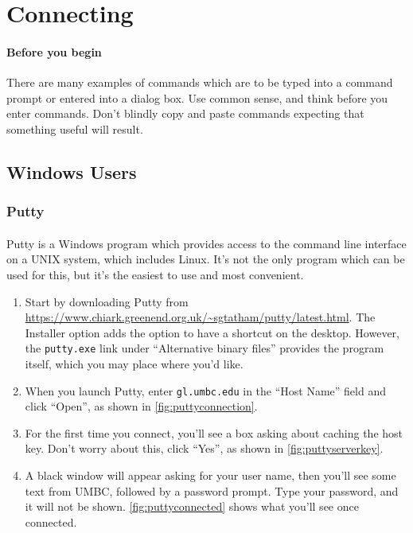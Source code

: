 \documentclass[letter,11pt]{article}
\begin{document}
\tableofcontents

\section{Connecting}
\paragraph{Before you begin} There are many examples of commands which are to be typed into a command prompt or entered into a dialog box. Use common sense, and think before you enter commands. Don't blindly copy and paste commands expecting that something useful will result.

\subsection{Windows Users}
\FloatBarrier
\subsubsection{Putty}
\paragraph{}Putty is a Windows program which provides access to the command line interface on a UNIX system, which includes Linux. It's not the only program which can be used for this, but it's the easiest to use and most convenient.

\begin{enumerate}
    \item Start by downloading Putty from \url{https://www.chiark.greenend.org.uk/~sgtatham/putty/latest.html}. The Installer option adds the option to have a shortcut on the desktop. However, the \texttt{putty.exe} link under ``Alternative binary files'' provides the program itself, which you may place where you'd like.
    \item When you launch Putty, enter \texttt{gl.umbc.edu} in the ``Host Name'' field and click ``Open'', as shown in \autoref{fig:puttyconnection}.
    \item For the first time you connect, you'll see a box asking about caching the host key. Don't worry about this, click ``Yes'', as shown in \autoref{fig:puttyserverkey}.
    \item A black window will appear asking for your user name, then you'll see some text from UMBC, followed by a password prompt. Type your password, and it will not be shown. \autoref{fig:puttyconnected} shows what you'll see once connected.
\end{enumerate}
\end{document}
